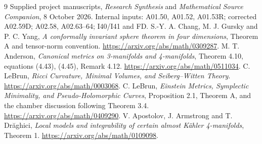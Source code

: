 \documentclass[11pt,a4paper]{article}
\theoremstyle{remark}\newtheorem{remark}[theorem]{Remark}
\begin{document}
\begin{thebibliography}{9}
 Supplied project manuscripts, \emph{Research Synthesis} and \emph{Mathematical Source Companion}, 8 October 2026. Internal inputs: A01.50, A01.52, A01.53R; corrected A02.59D; A02.58, A02.63--64; I40/I41 and FD.
 S.-Y. A. Chang, M. J. Gursky and P. C. Yang, \emph{A conformally invariant sphere theorem in four dimensions}, Theorem A and tensor-norm convention. \url{https://arxiv.org/abs/math/0309287}.
 M. T. Anderson, \emph{Canonical metrics on 3-manifolds and 4-manifolds}, Theorem 4.10, equations (4.43), (4.45), Remark 4.12. \url{https://arxiv.org/abs/math/0511034}.
 C. LeBrun, \emph{Ricci Curvature, Minimal Volumes, and Seiberg--Witten Theory}. \url{https://arxiv.org/abs/math/0003068}.
 C. LeBrun, \emph{Einstein Metrics, Symplectic Minimality, and Pseudo-Holomorphic Curves}, Proposition 2.1, Theorem A, and the chamber discussion following Theorem 3.4. \url{https://arxiv.org/abs/math/0409290}.
 V. Apostolov, J. Armstrong and T. Dr\u aghici, \emph{Local models and integrability of certain almost K\"ahler 4-manifolds}, Theorem 1. \url{https://arxiv.org/abs/math/0109098}.
\end{thebibliography}
\end{document}
